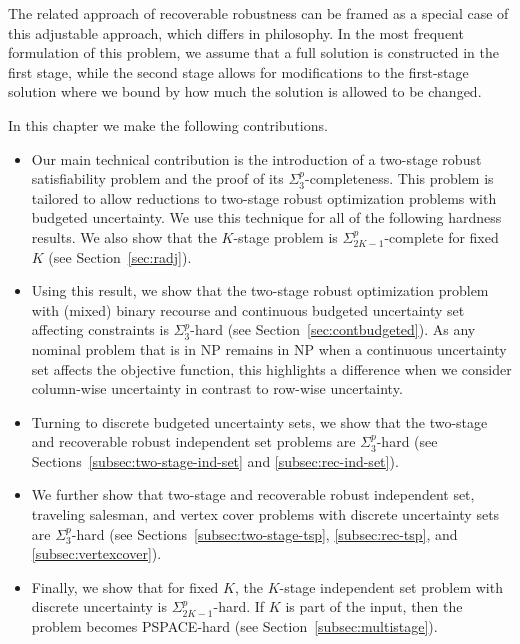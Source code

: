 The related approach of recoverable robustness \cite{liebchen2009concept} can be framed as a special case of this adjustable approach, which differs in philosophy. In the most frequent formulation of this problem, we assume that a full solution is constructed in the first stage, while the second stage allows for modifications to the first-stage solution where we bound by how much the solution is allowed to be changed.

In this chapter we make the following contributions.
\begin{itemize}
\item Our main technical contribution is the introduction of a two-stage robust satisfiability problem 
and the proof of its $\Sigma^p_3$-completeness. 
This problem is tailored to allow reductions to two-stage robust optimization problems with budgeted uncertainty.
We use this technique for all of the following hardness results.
We also show that the $K$-stage problem is $\Sigma_{2K-1}^p$-complete for fixed $K$ (see Section~\ref{sec:radj}).

\item Using this result, we show that the two-stage robust optimization problem with (mixed) binary recourse and continuous budgeted uncertainty set affecting constraints is $\Sigma_3^p$-hard (see Section~\ref{sec:contbudgeted}). As any nominal problem that is in NP remains in NP when a continuous uncertainty set affects the objective function, this highlights a difference when we consider column-wise uncertainty in contrast to row-wise uncertainty.

\item Turning to discrete budgeted uncertainty sets, we show that the two-stage and recoverable robust independent set problems are $\Sigma_3^p$-hard (see Sections~\ref{subsec:two-stage-ind-set} and \ref{subsec:rec-ind-set}).

\item We further show that two-stage and recoverable robust independent set, traveling salesman, and vertex cover problems with discrete uncertainty sets are $\Sigma_3^p$-hard (see Sections~\ref{subsec:two-stage-tsp}, \ref{subsec:rec-tsp}, and \ref{subsec:vertexcover}).

\item Finally, we show that for fixed $K$, the $K$-stage independent set problem with discrete uncertainty is $\Sigma_{2K-1}^p$-hard. If $K$ is part of the input, then the problem becomes PSPACE-hard (see Section~\ref{subsec:multistage}).
\end{itemize}

